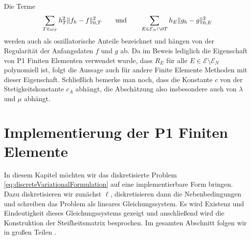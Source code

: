 \documentclass{scrartcl}
\newcommand{\cE}{\mathcal{E}}
\DeclarePairedDelimiter{\norm}{\lVert}{\rVert}
\begin{document}
Die Terme
\begin{align*}
	\sum_{T\in\omega_T}h_T^2\norm{f_h-f}_{0,T}^2 \qquad\text{und}\qquad\sum_{E\in\cE_N\cap \partial T}h_E\norm{g_h-g}_{0,E}^2
\end{align*}
werden auch als oszillatorische Anteile bezeichnet und hängen von der Regularität der Anfangsdaten $f$ und $g$ ab. 
Da im Beweis lediglich die Eigenschaft von P1 Finiten Elementen verwendet wurde, dass $R_E$ für alle $E\in\cE\setminus\cE_N$ polynomiell ist, folgt die Aussage auch für andere Finite Elemente Methoden mit dieser Eigenschaft.
Schließlich bemerke man noch, dass die Konstante $c$ von der Stetigkeitskonstante $c_A$ abhängt, die Abschätzung also insbesondere auch von $\lambda$ und $\mu$ abhängt.


\section{Implementierung der P1 Finiten Elemente}

In diesem Kapitel möchten wir das diskretisierte Problem \eqref{eq:discreteVariationalFormulation} auf eine implementierbare Form bringen. Dazu diskretisieren wir zunächst $\ell$, diskretisieren dann die Nebenbeding\-ungen und schreiben das Problem als lineares Gleichungssystem. Es wird Existenz und Eindeutigkeit dieses Gleichungssystems gezeigt und anschließend wird die Konstruktion der Steifheitsmatrix besprochen. Im gesamten Abschnitt folgen wir in großen Teilen \cite{Alb-2002}.
\end{document}
